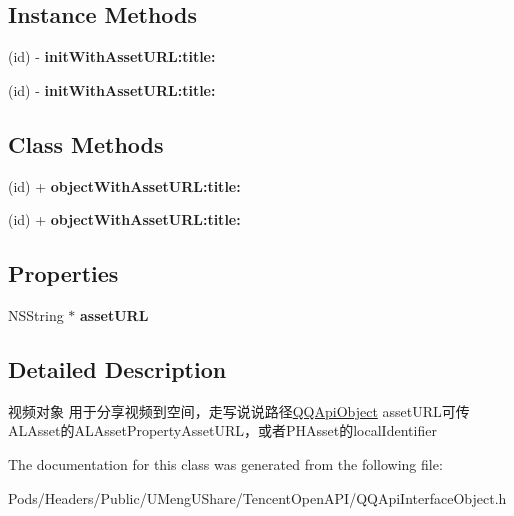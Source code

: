 \subsection*{Instance Methods}
\begin{DoxyCompactItemize}
\item 
\mbox{\label{interface_q_q_api_video_for_q_zone_object_ac8fbb0cbed6a8a5eb773891f2d64b1df}} 
(id) -\/ {\bfseries init\+With\+Asset\+U\+R\+L\+:title\+:}
\item 
\mbox{\label{interface_q_q_api_video_for_q_zone_object_ac8fbb0cbed6a8a5eb773891f2d64b1df}} 
(id) -\/ {\bfseries init\+With\+Asset\+U\+R\+L\+:title\+:}
\end{DoxyCompactItemize}
\subsection*{Class Methods}
\begin{DoxyCompactItemize}
\item 
\mbox{\label{interface_q_q_api_video_for_q_zone_object_ab6499aca749aa56dad124165ecaef720}} 
(id) + {\bfseries object\+With\+Asset\+U\+R\+L\+:title\+:}
\item 
\mbox{\label{interface_q_q_api_video_for_q_zone_object_ab6499aca749aa56dad124165ecaef720}} 
(id) + {\bfseries object\+With\+Asset\+U\+R\+L\+:title\+:}
\end{DoxyCompactItemize}
\subsection*{Properties}
\begin{DoxyCompactItemize}
\item 
\mbox{\label{interface_q_q_api_video_for_q_zone_object_ad4c8f5ea41d97f6166a72a87186db968}} 
N\+S\+String $\ast$ {\bfseries asset\+U\+RL}
\end{DoxyCompactItemize}


\subsection{Detailed Description}
视频对象 用于分享视频到空间，走写说说路径{\ttfamily \mbox{\hyperlink{interface_q_q_api_object}{Q\+Q\+Api\+Object}}} asset\+U\+R\+L可传\+A\+L\+Asset的\+A\+L\+Asset\+Property\+Asset\+U\+R\+L，或者\+P\+H\+Asset的local\+Identifier 

The documentation for this class was generated from the following file\+:\begin{DoxyCompactItemize}
\item 
Pods/\+Headers/\+Public/\+U\+Meng\+U\+Share/\+Tencent\+Open\+A\+P\+I/Q\+Q\+Api\+Interface\+Object.\+h\end{DoxyCompactItemize}
